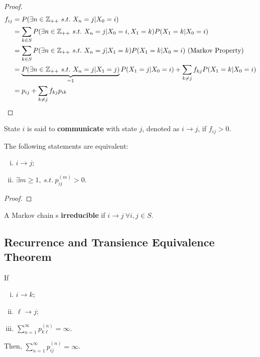 \documentclass{article}
\newcommand{\upn}[0]{^{(n)}}
\begin{document}
    \begin{proof}
    	\begin{align}
	    	f_{ij} &= P(\exists n \in \mathbb{Z}_{++} \ s.t.\ X_n = j|X_0 = i) \\
	    	&= \sum_{k \in S} P(\exists n \in \mathbb{Z}_{++} \ s.t.\ X_n = j|X_0 = i, X_1 = k) P(X_1=k|X_0=i) \\
	    	&= \sum_{k \in S} P(\exists n \in \mathbb{Z}_{++} \ s.t.\ X_n = j| X_1 = k) P(X_1=k|X_0=i) \text{{ (Markov Property)}} \\
	    	&= \underbrace{P(\exists n \in \mathbb{Z}_{++} \ s.t.\ X_n = j| X_1 = j)}_{=1} P(X_1=j|X_0=i)
	    	+ \sum_{k \neq j} f_{kj} P(X_1=k|X_0=i) \\
	    	&= p_{ij} + \sum_{k \neq j} f_{kj} p_{ik}
    	\end{align}
    \end{proof}
    
    \begin{definition}
    	State $i$ is said to \textbf{communicate} with state $j$, denoted as $i \to j$, if $f_{ij} > 0$.
    \end{definition}
    
    \begin{proposition}
    	The following statements are equivalent:
    	\begin{enumerate}[(i)]
    		\item $i \to j$;
    		\item $\exists m \geq 1,\ s.t.\ p_{ij}^{(m)} > 0$.
    	\end{enumerate}
    \end{proposition}
    
    \begin{proof}
    \end{proof}
    
    \begin{definition}
    	A Markov chain s \textbf{irreducible} if $i \to j\ \forall i,j \in S$.
    \end{definition}
    
    
    \subsection{Recurrence and Transience Equivalence Theorem}
    \begin{theorem}
    	If
    	\begin{enumerate}[(i)]
    		\item $i \to k$;
    		\item $\ell \to j$;
    		\item $\sum_{n=1}^\infty p_{k \ell}\upn = \infty$.
    	\end{enumerate}
    	Then, $\sum_{n=1}^\infty p_{ij}\upn = \infty$.
    \end{theorem}
    
\end{document}
